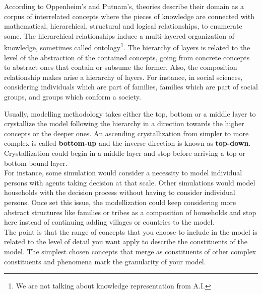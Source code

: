 \documentclass[11pt,oneside,a4paper,openright]{report}
\begin{document}
%
According to Oppenheim's and Putnam's\cite[p.1-2]{McGivernAndRueger}\cite{Unity_of_Science}, theories describe their domain as a corpus of interrelated concepts where the pieces of knowledge are connected with mathematical, hierarchical, structural and logical relationships, to enumerate some. The hierarchical relationships induce a multi-layered organization of knowledge, sometimes called ontology\footnote{We are not talking about knowledge representation from A.I.}. The hierarchy of layers is related to the level of the abstraction of the contained concepts, going from concrete concepts to abstract ones that contain or subsume the former. Also, the composition relationship makes arise a hierarchy of layers. For instance, in social sciences, considering individuals which are part of families, families which are part of social groups, and groups which conform a society. 





%

Usually, modelling methodology takes either the top, bottom or a middle layer to crystallize the model following the hierarchy in a direction towards the higher concepts or the deeper ones. An ascending crystallization from simpler to more complex is called \textbf{bottom-up} and the inverse direction is known as \textbf{top-down}. Crystallization could begin in a middle layer and stop before arriving a top or bottom bound layer.\\ 
For instance, some simulation would consider a necessity to model individual persons with agents taking decision at that scale. Other simulations would model households with the decision process without having to consider individual persons. Once set this issue, the modellization could keep considering more abstract structures like families or tribes as a composition of households and stop here instead of continuing adding villages or countries to the model.\\ 
The point is that the range of concepts that you choose to include in the model is related to the level of detail you want apply to describe the constituents of the model. The simplest chosen concepts that merge as constituents of other complex constituents and phenomena mark the granularity of your model. 
\end{document}

